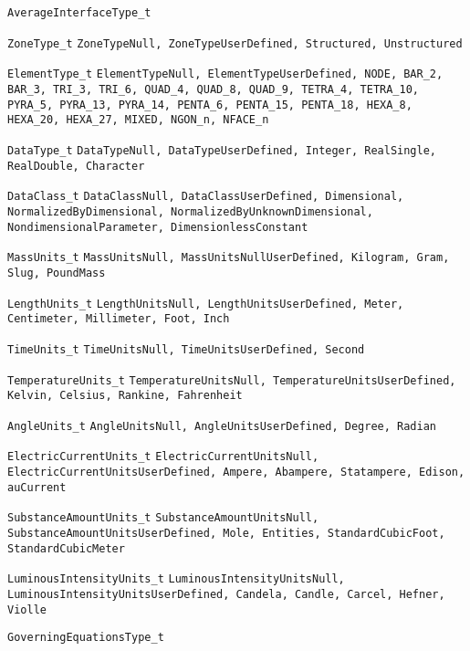 {\raggedright
\begin{Ventryi}{\texttt{AverageInterfaceType\_t}}
   \item [\texttt{ZoneType\_t}]
         \texttt{ZoneTypeNull, ZoneTypeUserDefined, Structured, Unstructured}
   \item [\texttt{ElementType\_t}]
         \texttt{ElementTypeNull, ElementTypeUserDefined, NODE, BAR\_2, BAR\_3, TRI\_3, TRI\_6, QUAD\_4,
         QUAD\_8, QUAD\_9, TETRA\_4, TETRA\_10, PYRA\_5, PYRA\_13,
         PYRA\_14, PENTA\_6, PENTA\_15, PENTA\_18, HEXA\_8,
         HEXA\_20, HEXA\_27, MIXED, NGON\_n, NFACE\_n}
   \item [\texttt{DataType\_t}]
         \texttt{DataTypeNull, DataTypeUserDefined, Integer, RealSingle, RealDouble, Character}
   \item [\texttt{DataClass\_t}]
         \texttt{DataClassNull, DataClassUserDefined, Dimensional, NormalizedByDimensional,
         NormalizedByUnknownDimensional, NondimensionalParameter,
         DimensionlessConstant}
   \item [\texttt{MassUnits\_t}]
         \texttt{MassUnitsNull, MassUnitsNullUserDefined, Kilogram, Gram, Slug, PoundMass}
   \item [\texttt{LengthUnits\_t}]
         \texttt{LengthUnitsNull, LengthUnitsUserDefined, Meter, Centimeter, Millimeter, Foot,
         Inch}
   \item [\texttt{TimeUnits\_t}]
         \texttt{TimeUnitsNull, TimeUnitsUserDefined, Second}
   \item [\texttt{TemperatureUnits\_t}]
         \texttt{TemperatureUnitsNull, TemperatureUnitsUserDefined, Kelvin, Celsius, Rankine,
         Fahrenheit}
   \item [\texttt{AngleUnits\_t}]
         \texttt{AngleUnitsNull, AngleUnitsUserDefined, Degree, Radian}
   \item [\texttt{ElectricCurrentUnits\_t}]
         \texttt{ElectricCurrentUnitsNull, ElectricCurrentUnitsUserDefined, Ampere, Abampere, Statampere, Edison,
         auCurrent}
   \item [\texttt{SubstanceAmountUnits\_t}]
         \texttt{SubstanceAmountUnitsNull, SubstanceAmountUnitsUserDefined, Mole, Entities, StandardCubicFoot,
         StandardCubicMeter}
   \item [\texttt{LuminousIntensityUnits\_t}]
         \texttt{LuminousIntensityUnitsNull, LuminousIntensityUnitsUserDefined, Candela, Candle, Carcel, Hefner, Violle}
   \item [\texttt{GoverningEquationsType\_t}]

\end{Ventryi}}

